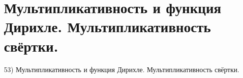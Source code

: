 \section{
 Мультипликативность и функция Дирихле. Мультипликативность свёртки.
}

53) Мультипликативность и функция Дирихле. Мультипликативность свёртки.
